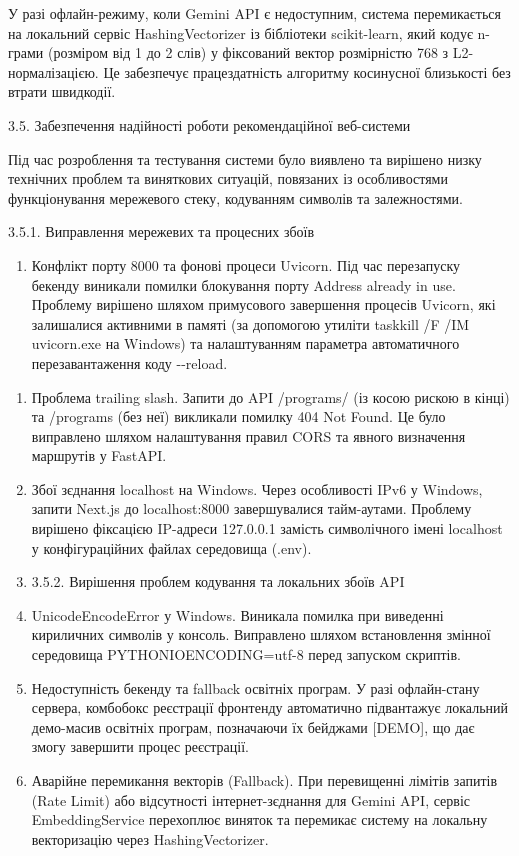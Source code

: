 \documentclass[
]{article}
\begin{document}
У разі офлайн-режиму, коли Gemini API є недоступним, система
перемикається на локальний сервіс HashingVectorizer із бібліотеки
scikit-learn, який кодує n-грами (розміром від 1 до 2 слів) у фіксований
вектор розмірністю 768 з L2-нормалізацією. Це забезпечує працездатність
алгоритму косинусної близькості без втрати швидкодії.

\protect{}\label{_Toc230434100}{}3.5. Забезпечення
надійності роботи рекомендаційної веб-системи

Під час розроблення та тестування системи було виявлено та вирішено
низку технічних проблем та виняткових ситуацій,
пов\textquotesingle язаних із особливостями функціонування мережевого
стеку, кодуванням символів та залежностями.

3.5.1. Виправлення мережевих та процесних збоїв

\begin{enumerate}
\def\labelenumi{\arabic{enumi}.}
\item
  Конфлікт порту 8000 та фонові процеси Uvicorn. Під час перезапуску
  бекенду виникали помилки блокування порту Address already in use.
  Проблему вирішено шляхом примусового завершення процесів Uvicorn, які
  залишалися активними в пам\textquotesingle яті (за допомогою утиліти
  taskkill /F /IM uvicorn.exe на Windows) та налаштуванням параметра
  автоматичного перезавантаження коду -\/-reload.
\end{enumerate}

\begin{enumerate}
\def\labelenumi{\arabic{enumi}.}
\setcounter{enumi}{22}
\item
  Проблема trailing slash. Запити до API /programs/ (із косою рискою в
  кінці) та /programs (без неї) викликали помилку 404 Not Found. Це було
  виправлено шляхом налаштування правил CORS та явного визначення
  маршрутів у FastAPI.
\item
  Збої з\textquotesingle єднання localhost на Windows. Через особливості
  IPv6 у Windows, запити Next.js до localhost:8000 завершувалися
  тайм-аутами. Проблему вирішено фіксацією IP-адреси 127.0.0.1 замість
  символічного імені localhost у конфігураційних файлах середовища
  (.env).
\item
  3.5.2. Вирішення проблем кодування та локальних збоїв API
\item
  UnicodeEncodeError у Windows. Виникала помилка при виведенні
  кириличних символів у консоль. Виправлено шляхом встановлення змінної
  середовища PYTHONIOENCODING=utf-8 перед запуском скриптів.
\item
  Недоступність бекенду та fallback освітніх програм. У разі
  офлайн-стану сервера, комбобокс реєстрації фронтенду автоматично
  підвантажує локальний демо-масив освітніх програм, позначаючи їх
  бейджами {[}DEMO{]}, що дає змогу завершити процес реєстрації.
\item
  Аварійне перемикання векторів (Fallback). При перевищенні лімітів
  запитів (Rate Limit) або відсутності
  інтернет-з\textquotesingle єднання для Gemini API, сервіс
  EmbeddingService перехоплює виняток та перемикає систему на локальну
  векторизацію через HashingVectorizer.
\end{enumerate}
\end{document}
